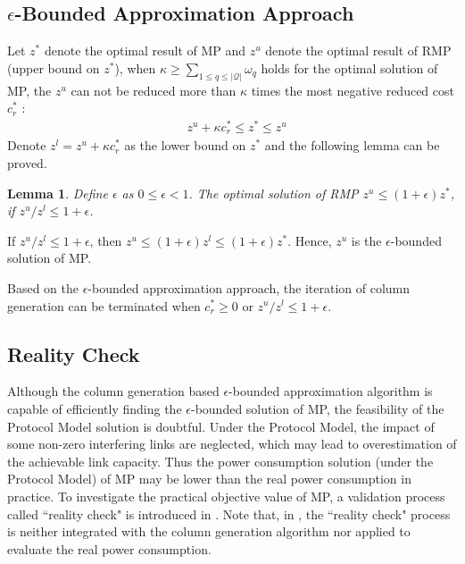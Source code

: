 \documentclass[10pt,journal]{IEEEtran}
\newtheorem{lemma}{Lemma}
\begin{document}
\subsection{$\epsilon$-Bounded Approximation Approach}
Let $z^{\ast}$ denote the optimal result of MP and $z^{u}$ denote the optimal result of RMP (upper bound on $z^{\ast}$), when $\kappa\geq\sum_{1\leq q\leq|\mathcal{Q}|}\omega_{q}$ holds for the optimal solution of MP, the $z^{u}$ can not be reduced more than $\kappa$ times the most negative reduced cost $c_{r}^{\ast}$ \cite{desrosiers2005primer} :
\begin{align}
&z^{u}+\kappa c_{r}^{\ast}\leq z^{\ast}\leq z^{u}\nonumber
\end{align}
Denote $z^{l}=z^{u}+\kappa c_{r}^{\ast}$ as the lower bound on $z^{\ast}$ and the following lemma can be proved.
\begin{lemma}
Define $\epsilon$ as $0\leq\epsilon<1$. The optimal solution of RMP $z^{u}\leq(1+\epsilon)z^{\ast}$, if $z^{u}/z^{l}\leq 1+\epsilon$.
\end{lemma}
\begin{IEEEproof}
If $z^{u}/z^{l}\leq 1+\epsilon$, then $z^{u}\leq(1+\epsilon)z^{l}\leq(1+\epsilon)z^{\ast}$. Hence, $z^{u}$ is the $\epsilon$-bounded solution of MP.
\end{IEEEproof}

Based on the $\epsilon$-bounded approximation approach, the iteration of column generation can be terminated when $c_{r}^{\ast}\geq0$ or $z^{u}/z^{l}\leq 1+\epsilon$.

\subsection{Reality Check}
Although the column generation based $\epsilon$-bounded approximation algorithm is capable of efficiently finding the $\epsilon$-bounded solution of MP, the feasibility of the Protocol Model solution is doubtful. Under the Protocol Model, the impact of some non-zero interfering links are neglected, which may lead to overestimation of the achievable link capacity. Thus the power consumption solution (under the Protocol Model) of MP may be lower than the real power consumption in practice. To investigate the practical objective value of MP, a validation process called ``reality check" is introduced in \cite{shi2013bridging}. Note that, in \cite{shi2013bridging}, the ``reality check" process is neither integrated with the column generation algorithm nor applied to evaluate the real power consumption.
\end{document}
